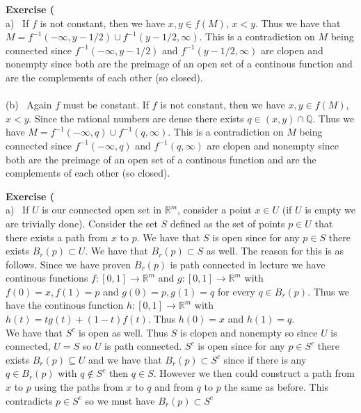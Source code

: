 \documentclass[12pt]{article}
\newenvironment{ques}[1]{\textbf{Exercise #1}\vspace{1 mm}\\ }{\bigskip}
\theoremstyle{definition}
\newcommand{\R}{\mathbb R}
\newcommand{\Q}{\mathbb Q}
\begin{document}
\begin{ques}{60}
	(a) \ If $f$ is not constant, then we have $x, y \in f(M)$, $x < y$. Thus
	we have that $M =  f^{-1}(-\infty, y - 1/2) \cup f^{-1}(y - 1/2, \infty)$.
	This is a contradiction on $M$ being connected since $f^{-1}(-\infty, y -
	1/2)$ and $f^{-1}(y - 1/2, \infty)$ are clopen and nonempty since both are
	the preimage of an open set of a continous function and are the complements
	of each other (so closed).\\
	\\
	(b) \ Again $f$ must be constant. If $f$ is not constant, then we have $x,
	y \in f(M)$, $x < y$. Since the rational numbers are dense there exists $q
	\in (x,y) \cap \Q$. Thus we have $M =  f^{-1}(-\infty, q) \cup
	f^{-1}(q, \infty)$.  This is a contradiction on $M$ being connected
	since $f^{-1}(-\infty, q)$ and $f^{-1}(q, \infty)$ are clopen
	and nonempty since both are the preimage of an open set of a continous
	function and are the complements of each other (so closed).\\

\end{ques}

\begin{ques}{66}
	(a) \ If $U$ is our connected open set in $\R^m$, consider a point $x \in
	U$ (if $U$ is empty we are trivially done). Consider the set $S$ defined as
	the set of points $p \in U$ that there exists a path from $x$ to $p$. We
	have that $S$ is open since for any $p \in S$ there exists $B_r(p) \subset
	U$.  We have that $B_r(p) \subset S$ as well. The reason for this is as
	follows. Since we have proven $B_r(p)$ is path connected in lecture we have
	continous functions $f:[0,1] \to \R^m$ and $g:[0,1] \to \R^m$ with $f(0) = x,
	f(1) = p$ and $g(0) = p, g(1) = q$ for every $q \in B_r(p)$. Thus we have
	the continous function $h:[0,1] \to \R^m$ with $h(t) = tg(t) + (1-t)f(t)$.
	Thus $h(0) = x$ and $h(1) = q$.\\
	We have that $S^c$ is open as well. Thus $S$ is clopen and nonempty so
	since $U$ is connected, $U = S$ so $U$ is path connected. $S^c$ is open
	since for any $p \in S^c$ there exists $B_r(p) \subseteq U$ and we have
	that $B_r(p) \subset S^c$ since if there is any $q \in B_r(p)$ with $q
	\notin S^c$ then $q \in S$. However we then could construct a path from $x$
	to $p$ using the paths from $x$ to $q$ and from $q$ to $p$ the same as
	before. This contradicts $p \in S^c$ so we must have $B_r(p) \subset S^c$
\end{ques}
\end{document}
